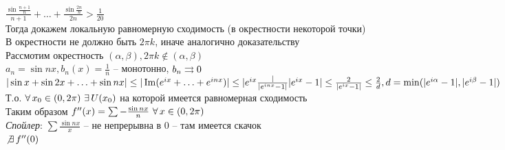 \documentclass[12pt]{article}
\begin{document}
$\frac{\sin \frac{n+1}n}{n+1} + \ldots + \frac{\sin \frac{2n}n}{2n} > \frac1{20}$\\
Тогда докажем локальную равномерную сходимость (в окрестности некоторой точки)\\
В окрестности не должно быть $2\pi k$, иначе аналогично доказательству\\
Рассмотим окрестность $(\alpha, \beta), 2\pi k \not\in (\alpha, \beta)$\\
$a_n = \sin nx, b_n(x) = \frac1n$ -- монотонно, $b_n \rightrightarrows 0$\\
$|\sin x + \sin 2x + \ldots + \sin nx| \leq |\operatorname{Im}(e^{ix} + \ldots + e^{inx})| \leq |e^{ix}\frac|{|e^{inx}-1|}{|e^{ix}-1|} \leq \frac2{|e^{ix}-1|} \leq \frac2d, d = \min(|e^{i\alpha}-1|, |e^{i\beta}-1|)$\\
Т.о. $\forall\, x_0 \in (0, 2\pi)\ \exists\, U(x_0)$ на которой имеется равномерная сходимость\\
Таким образом $f''(x) = \sum - \frac{\sin nx}{n}\ \forall\, x \in (0, 2\pi)$\\
\textit{Спойлер}: $\sum \frac{\sin nx}{x}$ -- не непрерывна в 0 -- там имеется скачок\\
$\not \exists\, f''(0)$\\
\end{document}
